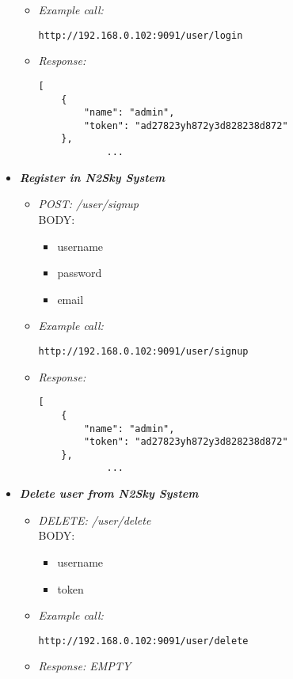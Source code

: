 \begin{itemize}
\begin{itemize}
\item \emph{Example call:}
 \begin{lstlisting}
http://192.168.0.102:9091/user/login
\end{lstlisting}

\item \emph{Response:}
 \begin{lstlisting}
[
    {
        "name": "admin",
        "token": "ad27823yh872y3d828238d872"
    },
            ...
\end{lstlisting}
\end{itemize}




\item \textbf{\textit{Register in N2Sky System}}
\begin{itemize}
\item \emph{POST: /user/signup}
\\BODY:
\begin{itemize}
\item username
\item password
\item email
\end{itemize}

\item \emph{Example call:}
 \begin{lstlisting}
http://192.168.0.102:9091/user/signup
\end{lstlisting}

\item \emph{Response:}
 \begin{lstlisting}
[
    {
        "name": "admin",
        "token": "ad27823yh872y3d828238d872"
    },
            ...
\end{lstlisting}
\end{itemize}




\item \textbf{\textit{Delete user from N2Sky System}}
\begin{itemize}
\item \emph{DELETE: /user/delete}
\\BODY:
\begin{itemize}
\item username
\item token
\end{itemize}

\item \emph{Example call:}
 \begin{lstlisting}
http://192.168.0.102:9091/user/delete
\end{lstlisting}

\item \emph{Response: EMPTY}

\end{itemize}


\end{itemize}


